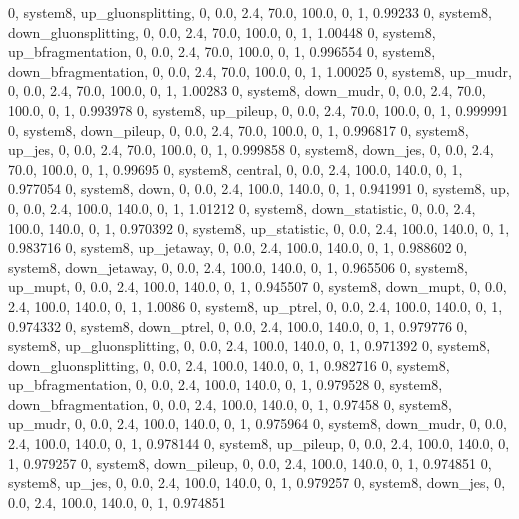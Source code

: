 0, system8, up_gluonsplitting, 0, 0.0, 2.4, 70.0, 100.0, 0, 1, 0.99233
0, system8, down_gluonsplitting, 0, 0.0, 2.4, 70.0, 100.0, 0, 1, 1.00448
0, system8, up_bfragmentation, 0, 0.0, 2.4, 70.0, 100.0, 0, 1, 0.996554
0, system8, down_bfragmentation, 0, 0.0, 2.4, 70.0, 100.0, 0, 1, 1.00025
0, system8, up_mudr,         0, 0.0, 2.4, 70.0, 100.0, 0, 1, 1.00283
0, system8, down_mudr,       0, 0.0, 2.4, 70.0, 100.0, 0, 1, 0.993978
0, system8, up_pileup,       0, 0.0, 2.4, 70.0, 100.0, 0, 1, 0.999991
0, system8, down_pileup,     0, 0.0, 2.4, 70.0, 100.0, 0, 1, 0.996817
0, system8, up_jes,          0, 0.0, 2.4, 70.0, 100.0, 0, 1, 0.999858
0, system8, down_jes,        0, 0.0, 2.4, 70.0, 100.0, 0, 1, 0.99695
0, system8, central,    0, 0.0, 2.4, 100.0, 140.0, 0, 1, 0.977054
0, system8, down,       0, 0.0, 2.4, 100.0, 140.0, 0, 1, 0.941991
0, system8, up,         0, 0.0, 2.4, 100.0, 140.0, 0, 1, 1.01212
0, system8, down_statistic,       0, 0.0, 2.4, 100.0, 140.0, 0, 1, 0.970392
0, system8, up_statistic,         0, 0.0, 2.4, 100.0, 140.0, 0, 1, 0.983716
0, system8, up_jetaway,      0, 0.0, 2.4, 100.0, 140.0, 0, 1, 0.988602
0, system8, down_jetaway,    0, 0.0, 2.4, 100.0, 140.0, 0, 1, 0.965506
0, system8, up_mupt,         0, 0.0, 2.4, 100.0, 140.0, 0, 1, 0.945507
0, system8, down_mupt,       0, 0.0, 2.4, 100.0, 140.0, 0, 1, 1.0086
0, system8, up_ptrel,        0, 0.0, 2.4, 100.0, 140.0, 0, 1, 0.974332
0, system8, down_ptrel,      0, 0.0, 2.4, 100.0, 140.0, 0, 1, 0.979776
0, system8, up_gluonsplitting, 0, 0.0, 2.4, 100.0, 140.0, 0, 1, 0.971392
0, system8, down_gluonsplitting, 0, 0.0, 2.4, 100.0, 140.0, 0, 1, 0.982716
0, system8, up_bfragmentation, 0, 0.0, 2.4, 100.0, 140.0, 0, 1, 0.979528
0, system8, down_bfragmentation, 0, 0.0, 2.4, 100.0, 140.0, 0, 1, 0.97458
0, system8, up_mudr,         0, 0.0, 2.4, 100.0, 140.0, 0, 1, 0.975964
0, system8, down_mudr,       0, 0.0, 2.4, 100.0, 140.0, 0, 1, 0.978144
0, system8, up_pileup,       0, 0.0, 2.4, 100.0, 140.0, 0, 1, 0.979257
0, system8, down_pileup,     0, 0.0, 2.4, 100.0, 140.0, 0, 1, 0.974851
0, system8, up_jes,          0, 0.0, 2.4, 100.0, 140.0, 0, 1, 0.979257
0, system8, down_jes,        0, 0.0, 2.4, 100.0, 140.0, 0, 1, 0.974851
